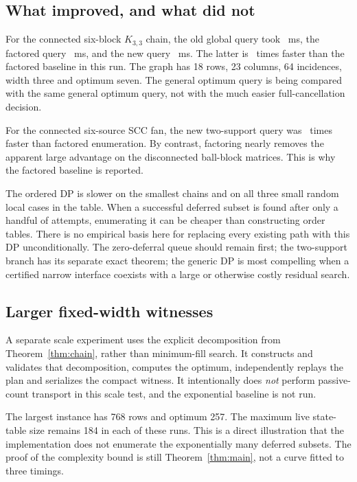 \documentclass[11pt]{article}
\theoremstyle{definition}\newtheorem{definition}[theorem]{Definition}
\theoremstyle{remark}\newtheorem{remark}[theorem]{Remark}
\begin{document}
\begin{table}[!htbp]
\centering
\small

\caption{Completed-query medians in milliseconds. ``Old'' is the actual global predecessor enumeration; ``Fact.'' adds component factoring. The final ratio is factored time divided by new time, so values below one are regressions. Width is the validated heuristic decomposition width; a dash marks a non-DP method.}
\label{tab:timing}
\end{table}

\subsection{What improved, and what did not}
For the connected six-block $K_{3,3}$ chain, the old global query took \ChainOld\ ms, the factored query \ChainFactored\ ms, and the new query \ChainNew\ ms. The latter is \ChainRatio\ times faster than the factored baseline in this run. The graph has 18 rows, 23 columns, 64 incidences, width three and optimum seven. The general optimum query is being compared with the same general optimum query, not with the much easier full-cancellation decision.

For the connected six-source SCC fan, the new two-support query was \FanRatio\ times faster than factored enumeration. By contrast, factoring nearly removes the apparent large advantage on the disconnected ball-block matrices. This is why the factored baseline is reported.

The ordered DP is slower on the smallest chains and on all three small random local cases in the table. When a successful deferred subset is found after only a handful of attempts, enumerating it can be cheaper than constructing order tables. There is no empirical basis here for replacing every existing path with this DP unconditionally. The zero-deferral queue should remain first; the two-support branch has its separate exact theorem; the generic DP is most compelling when a certified narrow interface coexists with a large or otherwise costly residual search.

\subsection{Larger fixed-width witnesses}
A separate scale experiment uses the explicit decomposition from Theorem~\ref{thm:chain}, rather than minimum-fill search. It constructs and validates that decomposition, computes the optimum, independently replays the plan and serializes the compact witness. It intentionally does \emph{not} perform passive-count transport in this scale test, and the exponential baseline is not run.
\begin{center}

\end{center}
The largest instance has 768 rows and optimum 257. The maximum live state-table size remains 184 in each of these runs. This is a direct illustration that the implementation does not enumerate the exponentially many deferred subsets. The proof of the complexity bound is still Theorem~\ref{thm:main}, not a curve fitted to three timings.
\end{document}
